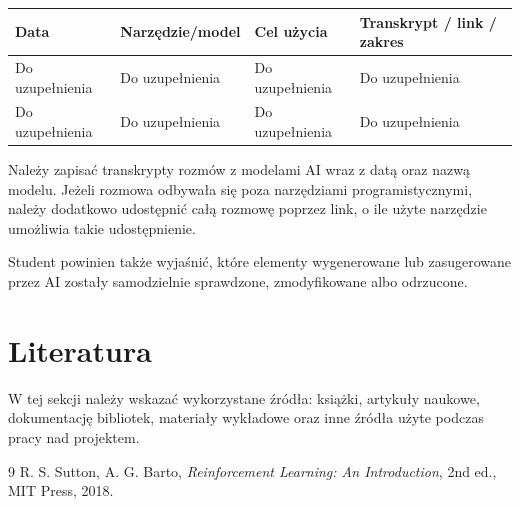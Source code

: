 \documentclass[12pt]{article}
\begin{document}
\begin{center}
\begin{tabular}{p{}p{}p{}p{}}
\toprule
Data & Narzędzie/model & Cel użycia & Transkrypt / link / zakres \\
\midrule
Do uzupełnienia & Do uzupełnienia & Do uzupełnienia & Do uzupełnienia \\
Do uzupełnienia & Do uzupełnienia & Do uzupełnienia & Do uzupełnienia \\
\bottomrule
\end{tabular}
\end{center}

Należy zapisać transkrypty rozmów z modelami AI wraz z datą oraz nazwą modelu. Jeżeli rozmowa odbywała się poza narzędziami programistycznymi, należy dodatkowo udostępnić całą rozmowę poprzez link, o ile użyte narzędzie umożliwia takie udostępnienie.

Student powinien także wyjaśnić, które elementy wygenerowane lub zasugerowane przez AI zostały samodzielnie sprawdzone, zmodyfikowane albo odrzucone.

\section{Literatura}

W tej sekcji należy wskazać wykorzystane źródła: książki, artykuły naukowe, dokumentację bibliotek, materiały wykładowe oraz inne źródła użyte podczas pracy nad projektem.

\begin{thebibliography}{9}
R. S. Sutton, A. G. Barto, \textit{Reinforcement Learning: An Introduction}, 2nd ed., MIT Press, 2018.
\end{thebibliography}
\end{document}
